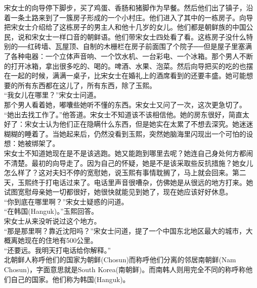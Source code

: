 \begin{multicols}{\theparacolNo}
宋女士的向导停下脚步，买了鸡蛋、香肠和猪脚作为早餐。然后他们出了镇子，沿着一条土路来到了一簇房子形成的一个小村庄。他们进入了其中的一栋房子。向导把宋女士介绍给了这栋房子的男主人和他十几岁的女儿。他们都是朝鲜族的中国公民，说和宋女士一样口音的朝鲜语。他们带宋女士四处看了看。这栋房子没什么特别的──红砖墙、瓦屋顶、自制的木栅栏在房子前面围了个院子──但是屋子里塞满了各种电器：一个立体声音响、一个饮水机、一台彩电、一个冰箱。那个男人不断的打开冰箱，拿出很多吃的、喝的。啤酒、水果、泡菜。然后向导把买的吃的也摆在一起的时候，满满一桌子，比宋女士在婚礼上的酒席看到的还要丰盛。她可能想要的所有东西都在这儿了，所有东西，除了玉熙。\\

“我女儿在哪里？”宋女士问道。\\

那个男人看着她，嘟囔些她听不懂的东西。宋女士又问了一次，这次更急切了。\\

“她出去找工作了。”他答道。宋女士不知道该不该相信他。她的房东很好，简直太好了：宋女士认为他们正在隐瞒什么东西，但是她实在太累了不想去深究。她迷迷糊糊的睡着了。当她起来后，仍然没看到玉熙，突然她脑海里闪现出一个可怕的设想：她被绑架了。\\

宋女士不知道她现在是不是该逃跑。她又能跑到哪里去呢？她连自己身处何方都闹不清楚。最初的向导走了。因为自己的怀疑，她是不是该采取些反抗措施？她女儿怎么样了？这对夫妇不停的宽慰她，说玉熙有事情耽搁了，马上就会回来。第二天，玉熙终于打电话过来了。电话里声音很嘈杂，仿佛她是从很远的地方打来。她试图宽慰母亲她一切都很好，她很快就能见到她了，现在她应该好好休息。\\

“你到底在哪里啊？”宋女士疑惑的问道。\\

“在韩国(Hanguk)。”玉熙回答。\\

宋女士从来没听说过这个地方。\\

“那是那里啊？靠近沈阳吗？”宋女士问道，提了一个中国东北地区最大的城市，大概离她现在的住地有500公里。\\

“还要远。我明天打电话给你解释。”\\

北朝鲜人称呼他们的国家为朝鲜(Chosun)而称呼他们分离的邻居南朝鲜(Nam Chosun)，字面意思就是South Korea(南朝鲜)。而南韩人则用完全不同的称呼称他们自己的国家。他们称为韩国(Hanguk)。\\


\end{multicols}
